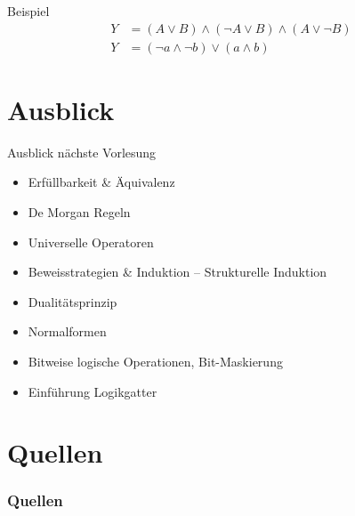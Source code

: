 \documentclass[12pt%
,aspectratio=169%
]{beamer}
\begin{document}
\begin{frame}{Beispiel}
\begin{align*}
Y &= (A \lor B) \land (\neg A \lor B) \land (A \lor \neg B)\\
Y &= (\neg a \land \neg b) \lor (a \land b)
\end{align*}
\end{frame}

\section{Ausblick}
\begin{frame}{Ausblick nächste Vorlesung}
\begin{itemize}
	\item Erfüllbarkeit \& Äquivalenz
	\item De Morgan Regeln
	\item Universelle Operatoren
	\item Beweisstrategien \& Induktion -- Strukturelle Induktion
	\item Dualitätsprinzip
	\item Normalformen
	\item Bitweise logische Operationen, Bit-Maskierung
	\item Einführung Logikgatter
\end{itemize}

\end{frame}

\section*{Quellen}
\appendix
\begin{frame}[allowframebreaks]
  \frametitle<presentation>{Quellen}
\printbibliography
\end{frame}
\end{document}
